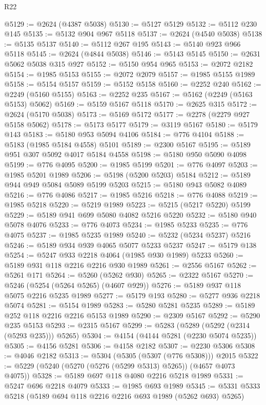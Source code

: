 \begin{lexlean}{R22}
\begin{coremodule}
@5129 := @2624 (@4387 @5038)
@5130 := @5127 @5129
@5132 := @5112 @230 @145
@5135 := @5132 @904 @967 @5118
@5137 := @2624 (@4540 @5038)
@5138 := @5135 @5137
@5140 := @5112 @267 @195
@5143 := @5140 @923 @966 @5118
@5145 := @2624 (@4844 @5038)
@5146 := @5143 @5145
@5150 := @2631 @5062 @5038 @315 @927
@5152 := @5150 @954 @965
@5153 := @2072 @2182
@5154 := @1985 @5153
@5155 := @2072 @2079
@5157 := @1985 @5155 @1989
@5158 := @5154 @5157
@5159 := @5152 @5158
@5160 := @2252 @240
@5162 := @2249 (@5160 @5155)
@5163 := @2252 @235
@5167 := @5162 (@2249 (@5163 @5153) @5062)
@5169 := @5159 @5167 @5118
@5170 := @2625 @315
@5172 := @2624 (@5170 @5038)
@5173 := @5169 @5172
@5177 := @2278 (@2279 @927 @5158 @5062)
@5178 := @5173 @5177
@5179 := @3119 @5167
@5180 := @5179 @143
@5183 := @5180 @953 @5094 @4106
@5184 := @776 @4104
@5188 := @5183 (@1985 @5184 @4558) @5101
@5189 := @2300 @5167
@5195 := @5189 @951 @307 @5092 @4017 @5184 @4558
@5198 := @5180 @950 @5090 @4098
@5199 := @776 @4095
@5200 := @1985 @5199
@5201 := @776 @4097
@5203 := @1985 @5201 @1989
@5206 := @5198 (@5200 @5203) @5184
@5212 := @5189 @944 @949 @5084 @5089 @5199 @5203
@5215 := @5180 @943 @5082 @4089
@5216 := @776 @4086
@5217 := @1985 @5216
@5218 := @776 @4088
@5219 := @1985 @5218
@5220 := @5219 @1989
@5223 := @5215 (@5217 @5220) @5199
@5229 := @5189 @941 @699 @5080 @4082 @5216 @5220
@5232 := @5180 @940 @5078 @4076
@5233 := @776 @4073
@5234 := @1985 @5233
@5235 := @776 @4075
@5237 := @1985 @5235 @1989
@5240 := @5232 (@5234 @5237) @5216
@5246 := @5189 @934 @939 @4065 @5077 @5233 @5237
@5247 := @5179 @138
@5254 := @5247 @933 @2218 @4064 (@1985 @930 @1989) @5233
@5260 := @5189 @931 @118 @2216 @2216 @930 @1989
@5261 := @2556 @5167
@5262 := @5261 @171
@5264 := @5260 (@5262 @930)
@5265 := @2322 @5167
@5270 := @5246 (@5254 (@5264 @5265) (@4607 @929))
@5276 := @5189 @937 @118 @5075 @2216 @5235 @1989
@5277 := @5179 @193
@5280 := @5277 @936 @2218 @5074
@5281 := @5154 @1989
@5283 := @5280 @5281 @5235
@5289 := @5189 @252 @118 @2216 @2216 @5153 @1989
@5290 := @2309 @5167
@5292 := @5290 @235 @5153
@5293 := @2315 @5167
@5299 := @5283 (@5289 (@5292 (@2314 (@5293 @235))) @5265)
@5304 := @4154 (@4144 @5281 (@2230 @5074 @5235))
@5305 := @4156 @5281
@5306 := @4158 @2182
@5307 := @2230 @5306
@5308 := @4046 @2182
@5313 := @5304 (@5305 (@5307 (@776 @5308))) @2015
@5322 := @5229 (@5240 (@5270 (@5276 (@5299 @5313) @5265)) (@4657 @4073 @4075))
@5328 := @5189 @697 @118 @4080 @2216 @5218 @1989
@5331 := @5247 @696 @2218 @4079
@5333 := @1985 @693 @1989
@5345 := @5331 @5333 @5218 (@5189 @694 @118 @2216 @2216 @693 @1989 (@5262 @693) @5265)

\end{coremodule}
\end{lexlean}
